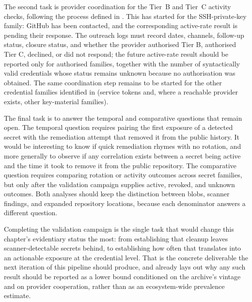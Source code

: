The second task is provider coordination for the Tier~B and Tier~C activity checks, following the process defined in .
This has started for the SSH-private-key family: GitHub has been contacted, and the corresponding active-rate result is pending their response.
The outreach logs must record dates, channels, follow-up status, closure status, and whether the provider authorised Tier B, authorised Tier C, declined, or did not respond; the future active-rate result should be reported only for authorised families, together with the number of syntactically valid credentials whose status remains unknown because no authorisation was obtained.
The same coordination step remains to be started for the other credential families identified in  (service tokens and, where a reachable provider exists, other key-material families).

The final task is to answer the temporal and comparative questions that remain open.
The temporal question requires pairing the first exposure of a detected secret with the remediation attempt that removed it from the public history.
It would be interesting to know if quick remediation rhymes with no rotation, and more generally to observe if any correlation exists between a secret being active and the time it took to remove it from the public repository.
The comparative question requires comparing rotation or activity outcomes across secret families, but only after the validation campaign supplies active, revoked, and unknown outcomes.
Both analyses should keep the distinction between blobs, scanner findings, and expanded repository locations, because each denominator answers a different question.

Completing the validation campaign is the single task that would change this chapter's evidentiary status the most: from establishing that cleanup leaves scanner-detectable secrets behind, to establishing how often that translates into an actionable exposure at the credential level.
That is the concrete deliverable the next iteration of this pipeline should produce, and  already lays out why any such result should be reported as a lower bound conditioned on the archive's vintage and on provider cooperation, rather than as an ecosystem-wide prevalence estimate.
